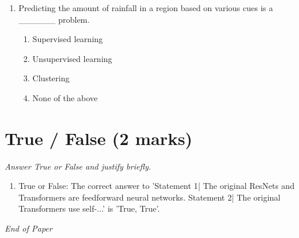 \documentclass[12pt]{article}
\begin{document}
\begin{enumerate}[label=\arabic*.]
\begin{enumerate}[label=(\alph*)]
    \item False, True
\end{enumerate}
\item Predicting the amount of rainfall in a region based on various cues is a \_\_\_\_\_\_ problem.
\begin{enumerate}[label=(\alph*)]
    \item Supervised learning
    \item Unsupervised learning
    \item Clustering
    \item None of the above
\end{enumerate}
\end{enumerate}

\section*{True / False (2 marks)}
\textit{Answer True or False and justify briefly.}
\begin{enumerate}[label=\arabic*.]
\item True or False: The correct answer to 'Statement 1| The original ResNets and Transformers are feedforward neural networks. Statement 2| The original Transformers use self-...' is 'True, True'.
\end{enumerate}

\vfill
\noindent\textit{End of Paper}
\end{document}
